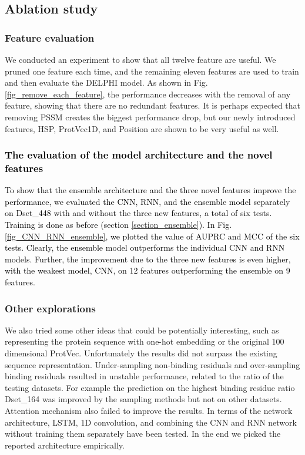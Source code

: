 \documentclass{bioinfo}
\newcommand{\myColor}{black}
\begin{document}
\subsection{Ablation study}

\subsubsection{Feature evaluation}
We conducted an experiment to show that all twelve feature are useful. We pruned one feature each time, and the remaining eleven features are used to train and then evaluate the DELPHI model. As shown in Fig. \ref{fig_remove_each_feature}, the performance decreases with the removal of any feature, showing that there are no redundant features. It is perhaps expected that  removing PSSM creates the biggest performance drop, but our newly introduced features, HSP, ProtVec1D, and Position are shown to be  very useful as well. 

\textcolor{\myColor}{
\subsubsection{The evaluation of the model architecture and the novel features}
To show that the ensemble architecture and the three novel features improve the performance, we evaluated the CNN, RNN, and the ensemble model separately on Dset\_448 with and without the three new features, a total of six tests. Training is done as before (section \ref{section_ensemble}). In Fig. \ref{fig_CNN_RNN_ensemble}, we plotted the value of AUPRC and MCC of the six tests. Clearly, the ensemble model outperforms the individual CNN and RNN models. Further, the improvement due to the three new features is even higher, with the weakest model, CNN, on 12 features outperforming the ensemble on 9 features. }

\subsubsection{Other explorations}
We also tried some other ideas that could be potentially interesting, such as representing the protein sequence with one-hot embedding or the original 100 dimensional ProtVec. Unfortunately the results did not surpass the existing sequence representation. Under-sampling non-binding residuals and over-sampling binding residuals resulted in unstable performance, related to the ratio of the testing datasets. For example the prediction on the highest binding residue ratio Dset\_164 was improved by the sampling methods but not on other datasets. Attention mechanism also failed to improve the results. In terms of the network architecture, LSTM, 1D convolution, and combining the CNN and RNN network without training them separately have been tested. In the end we picked the reported architecture empirically. 
\end{document}
